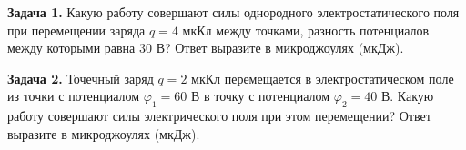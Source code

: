 
\begin{taskbasic}[code={\label{task:elem_pot_v23_n11}}]
\textbf{Задача 1.} Какую работу совершают силы однородного электростатического поля при перемещении заряда $q = 4\text{ мкКл}$ между точками, разность потенциалов между которыми равна $30\text{ В}$? Ответ выразите в микроджоулях (мкДж).

\end{taskbasic}

\begin{taskbasic}[code={\label{task:elem_pot_v24_n11}}]
\textbf{Задача 2.} Точечный заряд $q = 2\text{ мкКл}$ перемещается в электростатическом поле из точки с потенциалом $\varphi_1 = 60\text{ В}$ в точку с потенциалом $\varphi_2 = 40\text{ В}$. Какую работу совершают силы электрического поля при этом перемещении? Ответ выразите в микроджоулях (мкДж).

\end{taskbasic}

